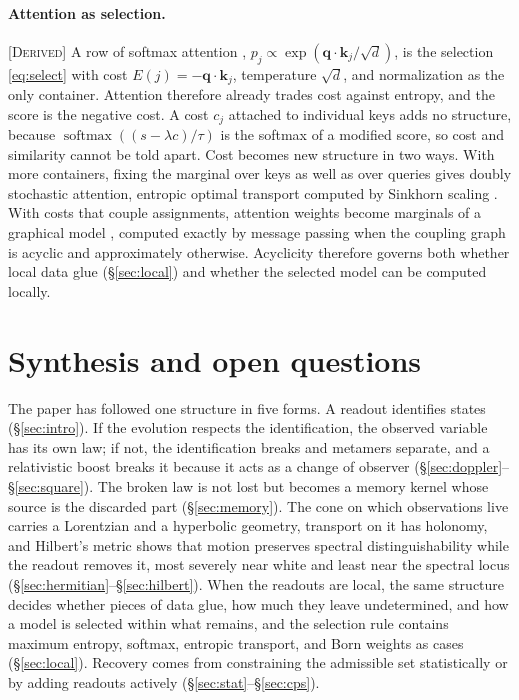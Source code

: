\documentclass[11pt]{article}
\theoremstyle{boldplain}
\theoremstyle{boldupright}
\newcommand{\derived}{[\textup{\textsc{Derived}}]}
\begin{document}
\paragraph{Attention as selection.} \derived{} A row of softmax attention \cite{vaswani2017},
$p_j\propto\exp(\mathbf{q}\cdot\mathbf{k}_j/\sqrt{d})$, is the selection \eqref{eq:select} with cost $E(j)=-\mathbf{q}\cdot\mathbf{k}_j$, temperature $\sqrt d$, and
normalization as the only container. Attention therefore already trades cost against entropy, and the
score is the negative cost. A cost $c_j$ attached to individual keys adds no structure, because
$\operatorname{softmax}((s-\lambda c)/\tau)$ is the softmax of a modified score, so cost and similarity cannot be told apart. Cost becomes
new structure in two ways. With more containers, fixing the marginal over keys as well as over queries
gives doubly stochastic attention, entropic optimal transport computed by Sinkhorn scaling
\cite{sinkhorn1964,sander2022}. With costs that couple assignments, attention weights become marginals of a graphical
model \cite{kim2017}, computed exactly by message passing when the coupling graph is acyclic \cite{lauritzen1996} and
approximately otherwise. Acyclicity therefore governs both whether local data glue (\S\ref{sec:local}) and whether
the selected model can be computed locally.

\section{Synthesis and open questions}\label{sec:synth}

The paper has followed one structure in five forms. A readout identifies states (\S\ref{sec:intro}). If the evolution
respects the identification, the observed variable has its own law; if not, the identification breaks
and metamers separate, and a relativistic boost breaks it because it acts as a change of observer
(\S\ref{sec:doppler}--\S\ref{sec:square}). The broken law is not lost but becomes a memory kernel whose source is the discarded part
(\S\ref{sec:memory}). The cone on which observations live carries a Lorentzian and a hyperbolic geometry, transport
on it has holonomy, and Hilbert's metric shows that motion preserves spectral distinguishability
while the readout removes it, most severely near white and least near the spectral locus (\S\ref{sec:hermitian}--\S\ref{sec:hilbert}).
When the readouts are local, the same structure decides whether pieces of data glue, how much they
leave undetermined, and how a model is selected within what remains, and the selection rule contains
maximum entropy, softmax, entropic transport, and Born weights as cases (\S\ref{sec:local}).
Recovery comes from constraining the admissible set statistically or by adding readouts actively
(\S\ref{sec:stat}--\S\ref{sec:cps}).
\end{document}
